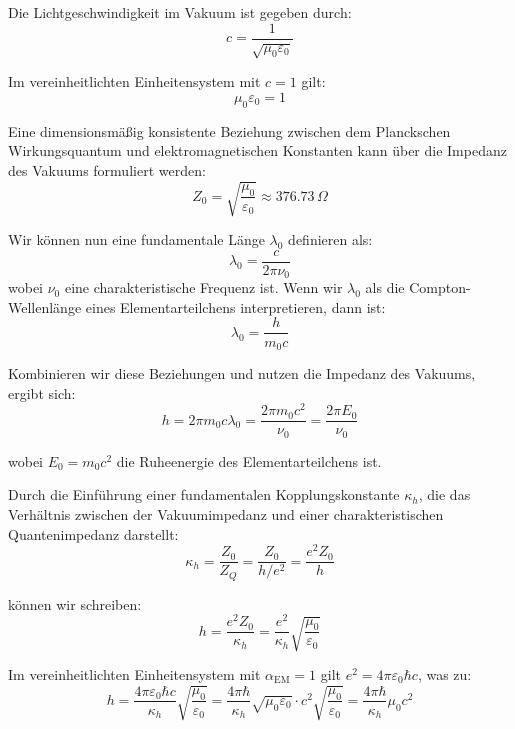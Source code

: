 \documentclass[12pt,a4paper]{article}
\newcommand{\alphaEM}{\alpha_{\text{EM}}}
\begin{document}
	Die Lichtgeschwindigkeit im Vakuum ist gegeben durch:
	\begin{equation}
		c = \frac{1}{\sqrt{\mu_0 \varepsilon_0}}
	\end{equation}
	
	Im vereinheitlichten Einheitensystem mit \(c = 1\) gilt:
	\begin{equation}
		\mu_0 \varepsilon_0 = 1
	\end{equation}
	
	Eine dimensionsmäßig konsistente Beziehung zwischen dem Planckschen Wirkungsquantum und elektromagnetischen Konstanten kann über die Impedanz des Vakuums formuliert werden:
	\begin{equation}
		Z_0 = \sqrt{\frac{\mu_0}{\varepsilon_0}} \approx 376.73 \, \Omega
	\end{equation}
	
	Wir können nun eine fundamentale Länge \(\lambda_0\) definieren als:
	\begin{equation}
		\lambda_0 = \frac{c}{2\pi \nu_0}
	\end{equation}
	wobei \(\nu_0\) eine charakteristische Frequenz ist. Wenn wir \(\lambda_0\) als die Compton-Wellenlänge eines Elementarteilchens interpretieren, dann ist:
	\begin{equation}
		\lambda_0 = \frac{h}{m_0 c}
	\end{equation}
	
	Kombinieren wir diese Beziehungen und nutzen die Impedanz des Vakuums, ergibt sich:
	\begin{equation}
		h = 2\pi m_0 c \lambda_0 = \frac{2\pi m_0 c^2}{\nu_0} = \frac{2\pi E_0}{\nu_0}
	\end{equation}
	
	wobei \(E_0 = m_0 c^2\) die Ruheenergie des Elementarteilchens ist.
	
	Durch die Einführung einer fundamentalen Kopplungskonstante \(\kappa_h\), die das Verhältnis zwischen der Vakuumimpedanz und einer charakteristischen Quantenimpedanz darstellt:
	\begin{equation}
		\kappa_h = \frac{Z_0}{Z_Q} = \frac{Z_0}{h/e^2} = \frac{e^2 Z_0}{h}
	\end{equation}
	
	können wir schreiben:
	\begin{equation}
		h = \frac{e^2 Z_0}{\kappa_h} = \frac{e^2}{\kappa_h} \sqrt{\frac{\mu_0}{\varepsilon_0}}
	\end{equation}
	
	Im vereinheitlichten Einheitensystem mit \(\alphaEM = 1\) gilt \(e^2 = 4\pi\varepsilon_0\hbar c\), was zu:
	\begin{equation}
		h = \frac{4\pi\varepsilon_0\hbar c}{\kappa_h} \sqrt{\frac{\mu_0}{\varepsilon_0}} = \frac{4\pi\hbar}{\kappa_h} \sqrt{\mu_0\varepsilon_0} \cdot c^2 \sqrt{\frac{\mu_0}{\varepsilon_0}} = \frac{4\pi\hbar}{\kappa_h} \mu_0 c^2
	\end{equation}
	
\end{document}
